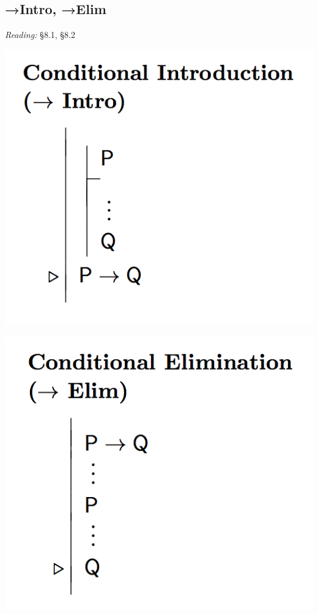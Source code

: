 \documentclass[12pt]{extarticle}
\begin{document}
\begin{multicols*}{3}
 
\section{→Intro, →Elim}
 
\emph{Reading:} §8.1, §8.2
 
\begin{center}
\includegraphics[scale=0.3]{img/rule_arrow_intro.png}
\end{center}
\begin{center}
\includegraphics[scale=0.3]{img/rule_arrow_elim.png}
\end{center}
 

\end{multicols*}
\end{document}
